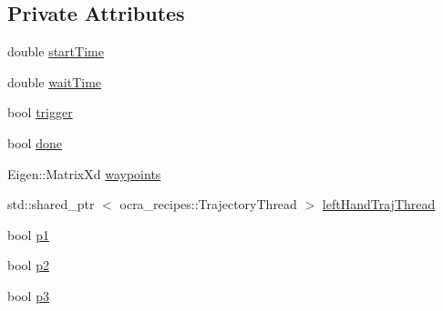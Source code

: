 \subsection*{\-Private \-Attributes}
\begin{DoxyCompactItemize}
\item 
double \hyperlink{classExampleClient_aaa5ec782e9aaa1e94d7182872f743c02}{start\-Time}
\item 
double \hyperlink{classExampleClient_acade7035d4e39290cbda08b98249a629}{wait\-Time}
\item 
bool \hyperlink{classExampleClient_a90ce0c4d970c903b3e6afb6f5ca2a228}{trigger}
\item 
bool \hyperlink{classExampleClient_acd2cf0f0479ff8bbf5b64924d83beb60}{done}
\item 
\-Eigen\-::\-Matrix\-Xd \hyperlink{classExampleClient_acf4657277ecb08168d9a17c208814823}{waypoints}
\item 
std\-::shared\-\_\-ptr\*
$<$ ocra\-\_\-recipes\-::\-Trajectory\-Thread $>$ \hyperlink{classExampleClient_a4311b0e8c4878c23df2b5ba048d8bc05}{left\-Hand\-Traj\-Thread}
\item 
bool \hyperlink{classExampleClient_a7fb2b50cbdac0ec3a32e44b5bbc3b11f}{p1}
\item 
bool \hyperlink{classExampleClient_a07c2bc5c5c522e77a726017c28db2ec9}{p2}
\item 
bool \hyperlink{classExampleClient_ab41df6f34a51e649051adbac6d3077f9}{p3}
\end{DoxyCompactItemize}


